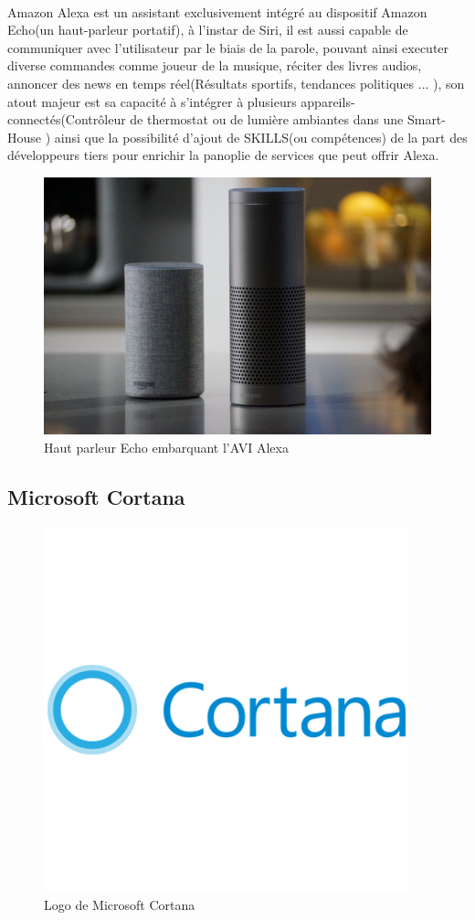 \paragraph{}Amazon Alexa est un assistant exclusivement intégré au dispositif Amazon Echo(un haut-parleur portatif), à l'instar de Siri, il est aussi capable de communiquer avec l'utilisateur par le biais de la parole, pouvant ainsi executer diverse commandes comme joueur de la musique, réciter des livres audios, annoncer des news en temps réel(Résultats sportifs, tendances politiques ... ), son atout majeur est sa capacité à s'intégrer à plusieurs appareils-connectés(Contrôleur de thermostat ou de lumière ambiantes dans une Smart-House ) ainsi que la possibilité d'ajout de SKILLS(ou compétences) de la part des développeurs tiers pour enrichir la panoplie de services que peut offrir Alexa.
\begin{figure}[H]
	\centering
	\includegraphics[width=.75\linewidth]{images/amazon_alexa/alexa.png}
	\caption{Haut parleur Echo embarquant l'AVI Alexa} 
\end{figure}
\subsection*{Microsoft Cortana}
\begin{figure}[H]
	\centering
	\includegraphics[width=.5\linewidth]{images/cortana/logo.png}
	\caption{Logo de Microsoft Cortana} 
\end{figure}
